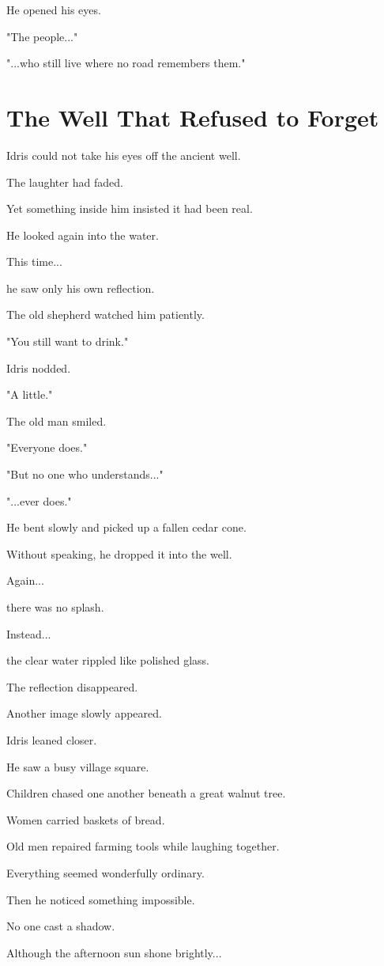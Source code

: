 \documentclass[12pt,openany]{book}
\begin{document}
He opened his eyes.

"The people..."

"...who still live where no road remembers them."
\section*{The Well That Refused to Forget}

Idris could not take his eyes off the ancient well.

The laughter had faded.

Yet something inside him insisted it had been real.

He looked again into the water.

This time...

he saw only his own reflection.

The old shepherd watched him patiently.

"You still want to drink."

Idris nodded.

"A little."

The old man smiled.

"Everyone does."

"But no one who understands..."

"...ever does."

He bent slowly and picked up a fallen cedar cone.

Without speaking, he dropped it into the well.

Again...

there was no splash.

Instead...

the clear water rippled like polished glass.

The reflection disappeared.

Another image slowly appeared.

Idris leaned closer.

He saw a busy village square.

Children chased one another beneath a great walnut tree.

Women carried baskets of bread.

Old men repaired farming tools while laughing together.

Everything seemed wonderfully ordinary.

Then he noticed something impossible.

No one cast a shadow.

Although the afternoon sun shone brightly...
\end{document}
